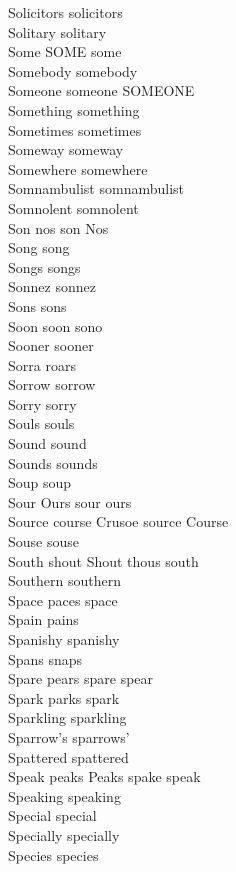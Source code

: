 Solicitors solicitors\\
Solitary solitary\\
Some SOME some\\
Somebody somebody\\
Someone someone SOMEONE\\
Something something\\
Sometimes sometimes\\
Someway someway\\
Somewhere somewhere\\
Somnambulist somnambulist\\
Somnolent somnolent\\
Son nos son Nos\\
Song song\\
Songs songs\\
Sonnez sonnez\\
Sons sons\\
Soon soon sono\\
Sooner sooner\\
Sorra roars\\
Sorrow sorrow\\
Sorry sorry\\
Souls souls\\
Sound sound\\
Sounds sounds\\
Soup soup\\
Sour Ours sour ours\\
Source course Crusoe source Course\\
Souse souse\\
South shout Shout thous south\\
Southern southern\\
Space paces space\\
Spain pains\\
Spanishy spanishy\\
Spans snaps\\
Spare pears spare spear\\
Spark parks spark\\
Sparkling sparkling\\
Sparrow's sparrows'\\
Spattered spattered\\
Speak peaks Peaks spake speak\\
Speaking speaking\\
Special special\\
Specially specially\\
Species species\\
